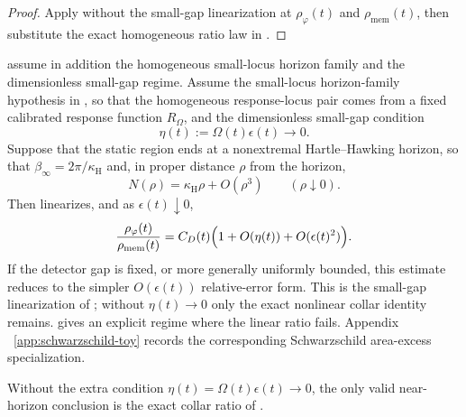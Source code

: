 \begin{proof}
Apply  without the small-gap
linearization at $\rho_\varphi(t)$ and $\rho_{\mathrm{mem}}(t)$, then substitute
the exact homogeneous ratio law in .
\end{proof}

\begin{corollary}\label{thm:horizon-main}
\ModelAClause assume in addition the homogeneous
small-locus horizon family and the dimensionless small-gap regime.
Assume the small-locus
horizon-family hypothesis in , so that the
homogeneous response-locus pair comes from a
fixed calibrated response function $R_\Omega$, and the dimensionless
small-gap condition
\[
\eta(t):=\Omega(t)\epsilon(t)\longrightarrow0 .
\]
Suppose that the static region ends at a nonextremal Hartle--Hawking horizon, so that $\beta_\infty=2\pi/\kappa_{\mathrm H}$ and, in proper distance $\rho$ from the horizon,
\begin{equation}\label{eq:horizon-main}
N(\rho)=\kappa_{\mathrm H}\rho+O(\rho^3)
\qquad(\rho\downarrow0).
\end{equation}
Then  linearizes, and as
$\epsilon(t)\downarrow0$,
\begin{equation}\label{eq:rho-ratio-main}
\frac{\rho_{\varphi}(t)}{\rho_{\mathrm{mem}}(t)}
=
C_D(t)\Bigl(1+O(\eta(t))+O(\epsilon(t)^2)\Bigr).
\end{equation}
If the detector gap is fixed, or more generally uniformly bounded, this
estimate reduces to the simpler $O(\epsilon(t))$ relative-error form.
This is the small-gap linearization of
; without $\eta(t)\to0$ only the exact
nonlinear collar identity remains.  gives
an explicit regime where the linear ratio fails. Appendix
~\ref{app:schwarzschild-toy} records the corresponding Schwarzschild
area-excess specialization.
\end{corollary}

Without the extra condition $\eta(t)=\Omega(t)\epsilon(t)\to0$, the only valid
near-horizon conclusion is the exact collar ratio of
.

